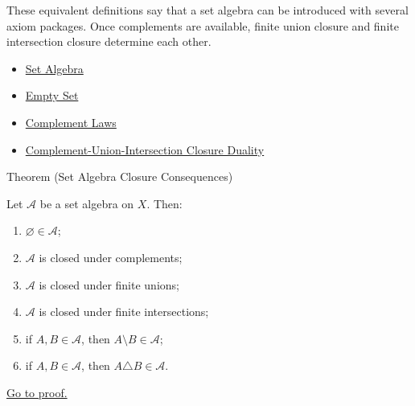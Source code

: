 \begin{remark*}[Interpretation]
These equivalent definitions say that a set algebra can be introduced with
several axiom packages.  Once complements are available, finite union closure
and finite intersection closure determine each other.
\end{remark*}


\begin{dependencies}
\begin{itemize}
  \item \hyperref[def:set-algebra]{Set Algebra}
  \item \hyperref[def:empty-set]{Empty Set}
  \item \hyperref[thm:complement-laws]{Complement Laws}
  \item \hyperref[thm:complement-union-intersection-closure-duality]{Complement-Union-Intersection Closure Duality}
\end{itemize}
\end{dependencies}

\begin{theorembox}{Theorem (Set Algebra Closure Consequences)}
\begin{theorem}\label{thm:set-algebra-closure-consequences}
Let \(\mathcal A\) be a set algebra on \(X\).  Then:
\begin{enumerate}[label=(\roman*)]
\item \(\varnothing\in\mathcal A\);
\item \(\mathcal A\) is closed under complements;
\item \(\mathcal A\) is closed under finite unions;
\item \(\mathcal A\) is closed under finite intersections;
\item if \(A,B\in\mathcal A\), then \(A\setminus B\in\mathcal A\);
\item if \(A,B\in\mathcal A\), then \(A\triangle B\in\mathcal A\).
\end{enumerate}
\hyperref[prf:set-algebra-closure-consequences]{Go to proof.}
\end{theorem}
\end{theorembox}

